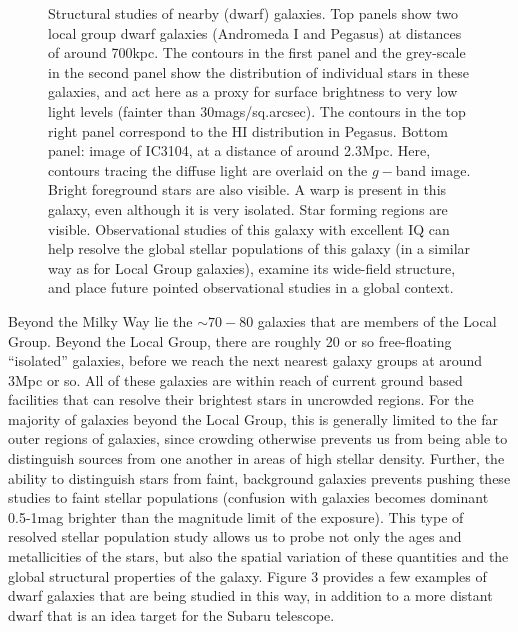\begin{figure*}
  \begin{center}
    \caption{Structural studies of nearby (dwarf) galaxies. Top panels
   show two local group dwarf galaxies (Andromeda I and Pegasus) at
   distances of around 700kpc. The contours in the first panel and the
   grey-scale in the second panel show the distribution of individual
   stars in these galaxies, and act here as a proxy for surface
   brightness to very low light levels (fainter than
   30mags/sq.arcsec). The contours in the top right panel correspond to
   the HI distribution in Pegasus. Bottom panel: image of IC3104, at a
   distance of around 2.3Mpc. Here, contours tracing the diffuse light
   are overlaid on the $g-$band image. Bright foreground stars are also
   visible. A warp is present in this galaxy, even although it is very
   isolated. Star forming regions are visible. Observational studies of
   this galaxy with excellent IQ can help resolve the global stellar
   populations of this galaxy (in a similar way as for Local Group
   galaxies), examine its wide-field structure, and place future pointed
   observational studies in a global context.}
  \end{center}
\end{figure*}

Beyond the Milky Way lie the $\sim 70-80$ galaxies that are members of
the Local Group. Beyond the Local Group, there are roughly 20 or so
free-floating ``isolated'' galaxies, before we reach the next nearest
galaxy groups at around 3Mpc or so. All of these galaxies are within
reach of current ground based facilities that can resolve their
brightest stars in uncrowded regions. For the majority of galaxies
beyond the Local Group, this is generally limited to the far outer
regions of galaxies, since crowding otherwise prevents us from being
able to distinguish sources from one another in areas of high stellar
density. Further, the ability to distinguish stars from faint,
background galaxies prevents pushing these studies to faint stellar
populations (confusion with galaxies becomes dominant 0.5-1mag brighter
than the magnitude limit of the exposure). This type of resolved stellar
population study allows us to probe not only the ages and metallicities
of the stars, but also the spatial variation of these quantities and the
global structural properties of the galaxy. Figure 3 provides a few
examples of dwarf galaxies that are being studied in this way, in
addition to a more distant dwarf that is an idea target for the Subaru
telescope. 


